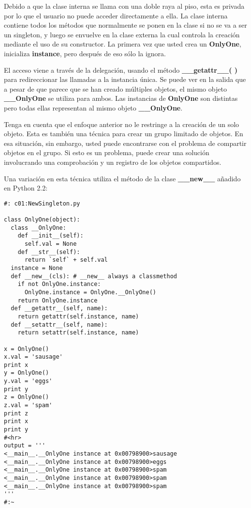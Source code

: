 Debido a que la clase interna se llama con una doble raya al piso, esta es privada por lo que el usuario no puede acceder directamente a ella.  La clase interna contiene todos los métodos que normalmente se ponen en la clase si no se va a ser un singleton, y luego se envuelve en la clase externa la cual controla la creación mediante el uso de su constructor. La primera vez que usted crea un \textbf{OnlyOne}, inicializa \textbf{instance}, pero después de eso sólo la ignora.  \newline

El acceso viene a través de la delegación, usando el método \textbf{\_\_getattr\_\_( )} para redireccionar las llamadas a la instancia única. Se puede ver en la salida que a pesar de que parece que se han creado múltiples objetos, el mismo objeto \textbf{\_\_OnlyOne} se utiliza para ambos. Las instancias de \textbf{OnlyOne} son distintas pero todas ellas representan al mismo objeto \textbf{\_\_OnlyOne}.     \newline

Tenga en cuenta que el enfoque anterior no le restringe a la creación de un solo objeto. Esta es también una técnica para crear un grupo limitado de objetos. En esa situación, sin embargo, usted puede encontrarse con el problema de compartir objetos en el grupo. Si esto es un problema, puede crear una solución involucrando una comprobación y un registro de los objetos compartidos.     \newline

Una variación en esta técnica utiliza el método de la clase \textbf{\_\_new\_\_} añadido en Python 2.2:     \newline

 \begin{lstlisting}
#: c01:NewSingleton.py 

class OnlyOne(object): 
  class __OnlyOne: 
    def __init__(self): 
      self.val = None 
    def __str__(self): 
      return `self` + self.val 
  instance = None 
  def __new__(cls): # __new__ always a classmethod 
    if not OnlyOne.instance: 
      OnlyOne.instance = OnlyOne.__OnlyOne() 
    return OnlyOne.instance 
  def __getattr__(self, name): 
    return getattr(self.instance, name) 
  def __setattr__(self, name): 
    return setattr(self.instance, name)
    
x = OnlyOne() 
x.val = 'sausage' 
print x 
y = OnlyOne() 
y.val = 'eggs' 
print y 
z = OnlyOne() 
z.val = 'spam' 
print z 
print x 
print y 
#<hr> 
output = ''' 
<__main__.__OnlyOne instance at 0x00798900>sausage 
<__main__.__OnlyOne instance at 0x00798900>eggs 
<__main__.__OnlyOne instance at 0x00798900>spam 
<__main__.__OnlyOne instance at 0x00798900>spam 
<__main__.__OnlyOne instance at 0x00798900>spam 
''' 
#:~     
 \end{lstlisting}
 

